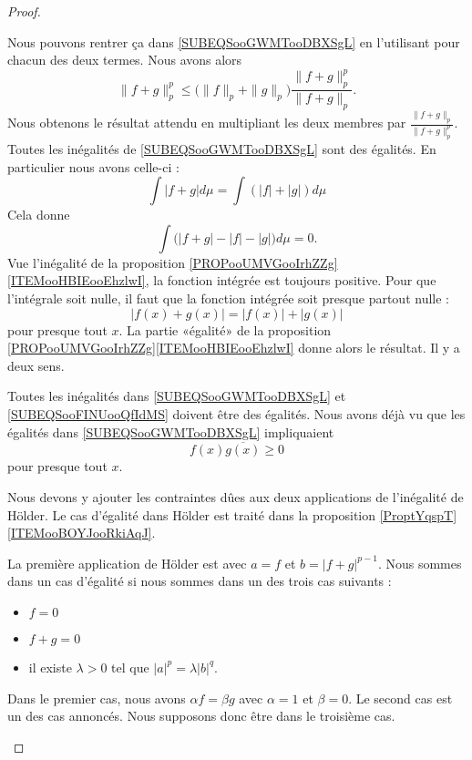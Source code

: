 \begin{proof}
\begin{subproof}
		Nous pouvons rentrer ça dans \eqref{SUBEQSooGWMTooDBXSgL} en l'utilisant pour chacun des deux termes. Nous avons alors
		\begin{equation}
			\| f+g \|_p^p\leq \big( \| f \|_p+\| g \|_p \big)\frac{ \| f+g \|_p^p }{ \| f+g \|_p }.
		\end{equation}
		Nous obtenons le résultat attendu en multipliant les deux membres par \( \frac{ \| f+g \|_p }{ \| f+g \|_p^p }\).
		Toutes les inégalités de \eqref{SUBEQSooGWMTooDBXSgL} sont des égalités. En particulier nous avons celle-ci :
		\begin{equation}
			\int | f+g |d\mu=\int(| f |+| g |)d\mu
		\end{equation}
		Cela donne
		\begin{equation}
			\int\big( | f+g |-| f |-|g| \big)d\mu=0.
		\end{equation}
		Vue l'inégalité de la proposition \ref{PROPooUMVGooIrhZZg}\ref{ITEMooHBIEooEhzlwI}, la fonction intégrée est toujours positive. Pour que l'intégrale soit nulle, il faut que la fonction intégrée soit presque partout nulle :
		\begin{equation}
			| f(x)+g(x) |=| f(x) |+| g(x) |
		\end{equation}
		pour presque tout \( x\). La partie «égalité» de la proposition \ref{PROPooUMVGooIrhZZg}\ref{ITEMooHBIEooEhzlwI} donne alors le résultat.
		Il y a deux sens.
		\begin{subproof}
			\spitem[\(  \Rightarrow\)]
			Toutes les inégalités dans \eqref{SUBEQSooGWMTooDBXSgL} et \eqref{SUBEQSooFINUooQfIdMS} doivent être des égalités. Nous avons déjà vu que les égalités dans \eqref{SUBEQSooGWMTooDBXSgL} impliquaient
			\begin{equation}
				f(x)\overline{ g(x) }\geq 0
			\end{equation}
			pour presque tout \( x\).

			Nous devons y ajouter les contraintes dûes aux deux applications de l'inégalité de Hölder. Le cas d'égalité dans Hölder est traité dans la proposition \ref{ProptYqspT}\ref{ITEMooBOYJooRkiAqJ}.

			La première application de Hölder est avec \( a=f\) et \( b=| f+g |^{p-1}\). Nous sommes dans un cas d'égalité si nous sommes dans un des trois cas suivants :
			\begin{itemize}
				\item \( f=0\)
				\item \( f+g=0\)
				\item il existe \( \lambda>0\) tel que \( | a |^p=\lambda | b |^q\).
			\end{itemize}
			Dans le premier cas, nous avons \( \alpha f=\beta g\) avec \( \alpha=1\) et \( \beta=0\). Le second cas est un des cas annoncés. Nous supposons donc être dans le troisième cas.


\end{subproof}
\end{subproof}
\end{proof}
